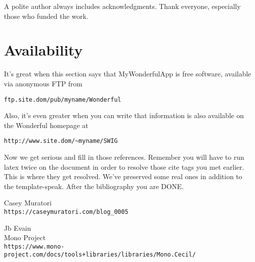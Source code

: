 \documentclass[letterpaper,twocolumn,10pt]{article}
\begin{document}
A polite author always includes acknowledgments.  Thank everyone,
especially those who funded the work. 

\section{Availability}

It's great when this section says that MyWonderfulApp is free software, 
available via anonymous FTP from

\begin{center}
{\tt ftp.site.dom/pub/myname/Wonderful}\\
\end{center}

Also, it's even greater when you can write that information is also 
available on the Wonderful homepage at 

\begin{center}
{\tt http://www.site.dom/\~{}myname/SWIG}
\end{center}

Now we get serious and fill in those references.  Remember you will
have to run latex twice on the document in order to resolve those
cite tags you met earlier.  This is where they get resolved.
We've preserved some real ones in addition to the template-speak.
After the bibliography you are DONE.

\begin{thebibliography}{9}
    Casey Muratori\\
    \texttt{https://caseymuratori.com/blog\_0005}

    Jb Evain\\
    Mono Project\\
    \texttt{https://www.mono-project.com/docs/tools+libraries/libraries/Mono.Cecil/}
\end{thebibliography}






\theendnotes
\end{document}
